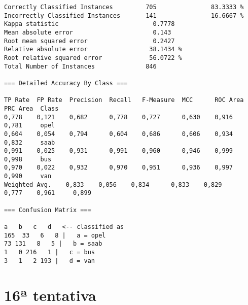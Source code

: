 \documentclass[
	article,			%
	11pt,				%
	oneside,			%
	a4paper,			%
	english,			%
	brazil,				%
	sumario=tradicional
	]{abntex2}
\begin{document}
\begin{lstlisting}
Correctly Classified Instances         705               83.3333 %
Incorrectly Classified Instances       141               16.6667 %
Kappa statistic                          0.7778
Mean absolute error                      0.143 
Root mean squared error                  0.2427
Relative absolute error                 38.1434 %
Root relative squared error             56.0722 %
Total Number of Instances              846     

=== Detailed Accuracy By Class ===

TP Rate  FP Rate  Precision  Recall   F-Measure  MCC      ROC Area  PRC Area  Class
0,778    0,121    0,682      0,778    0,727      0,630    0,916     0,781     opel
0,604    0,054    0,794      0,604    0,686      0,606    0,934     0,832     saab
0,991    0,025    0,931      0,991    0,960      0,946    0,999     0,998     bus
0,970    0,022    0,932      0,970    0,951      0,936    0,997     0,990     van
Weighted Avg.    0,833    0,056    0,834      0,833    0,829      0,777    0,961     0,899     

=== Confusion Matrix ===

a   b   c   d   <-- classified as
165  33   6   8 |   a = opel
73 131   8   5 |   b = saab
1   0 216   1 |   c = bus
3   1   2 193 |   d = van
\end{lstlisting}

\section{16ª tentativa}
\end{document}
